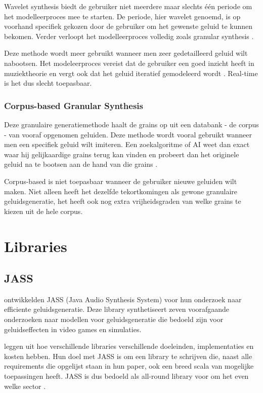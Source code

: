 Wavelet synthesis biedt de gebruiker niet meerdere maar slechts één periode om het modelleerproces mee te starten. De periode, hier wavelet genoemd, is op voorhand specifiek gekozen door de gebruiker om het gewenste geluid te kunnen bekomen. Verder verloopt het modelleerproces volledig zoals granular synthesis \autocite{wavelet}.

Deze methode wordt meer gebruikt wanneer men zeer gedetailleerd geluid wilt nabootsen. Het modeleerproces vereist dat de gebruiker een goed inzicht heeft in muziektheorie en vergt ook dat het geluid iteratief gemodeleerd wordt 
\autocite{wavelet}. Real-time is het dus slecht toepasbaar.

\subsubsection{Corpus-based Granular Synthesis}

Deze granulaire generatiemethode haalt de grains op uit een databank - de corpus - van vooraf opgenomen geluiden. Deze methode wordt vooral gebruikt wanneer men een specifiek geluid wilt imiteren. Een zoekalgoritme of AI weet dan exact waar hij gelijkaardige grains terug kan vinden en probeert dan het originele geluid na te bootsen aan de hand van die grains 
\autocite{methodes}.

Corpus-based is niet toepasbaar wanneer de gebruiker nieuwe geluiden wilt maken. Niet alleen heeft het dezelfde tekortkomingen als gewone granulaire geluidsgeneratie, het heeft ook nog extra vrijheidsgraden van welke grains te kiezen uit de hele corpus.

\section{Libraries}

\subsection{JASS}

\textcite{jass} ontwikkelden JASS (Java Audio Synthesis System) voor hun onderzoek naar efficiente geluidsgeneratie. Deze library synthetiseert zeven voorafgaande onderzoeken naar modellen voor geluidsgeneratie die bedoeld zijn voor geluidseffecten in video games en simulaties. 

\textcite{jass} leggen uit hoe verschillende libraries verschillende doeleinden, implementaties en kosten hebben. Hun doel met JASS is om een library te schrijven die, naast alle requirements die opgelijst staan in hun paper, ook een breed scala van mogelijke toepassingen heeft. JASS is dus bedoeld als all-round library voor om het even welke sector \autocite{jass}.


